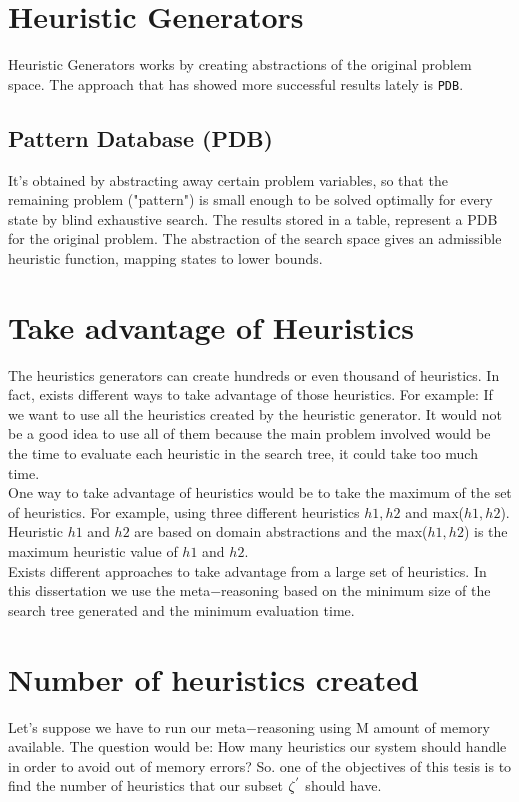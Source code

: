 \section{Heuristic Generators}
Heuristic Generators works by creating abstractions of the original problem space. The approach that has showed more successful results lately is \texttt{PDB}.

\subsection{Pattern Database (PDB)}
It's obtained by abstracting away certain problem variables, so that the remaining problem ("pattern") is small enough to be solved optimally for every state by blind exhaustive search. The results stored in a table, represent a PDB for the original problem. The abstraction of the search space gives an admissible heuristic function, mapping states to lower bounds.

\section{Take advantage of Heuristics}
The heuristics generators can create hundreds or even thousand of heuristics. In fact, exists different ways to take advantage of those heuristics. For example: If we want to use all the heuristics created by the heuristic generator. It would not be a good idea to use all of them because the main problem involved would be the time to evaluate each heuristic in the search tree, it could take too much time. \\

One way to take advantage of heuristics would be to take the maximum of the set of heuristics. For example, using three different heuristics $h1, h2$ and max($h1, h2$). Heuristic $h1$ and $h2$ are based on domain abstractions and the max($h1, h2$) is the maximum heuristic value of $h1$ and $h2$. \\

Exists different approaches to take advantage from a large set of heuristics. In this dissertation we use the meta$-$reasoning based on the minimum size of the search tree generated and the minimum evaluation time. \\

\section{Number of heuristics created}
Let's suppose we have to run our meta$-$reasoning using M amount of memory available. The question would be: How many heuristics our system should handle in order to avoid out of memory errors? So. one of the objectives of this tesis is to find the number of heuristics that our subset $\zeta\sp{'}$ should have. \\

